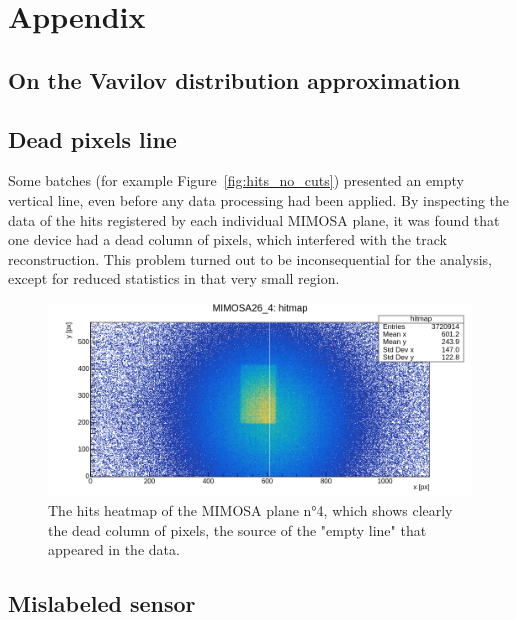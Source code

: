 \chapter{Appendix}\label{chap:appendix}


\section[Vavilov vs Landau distribution]{On the Vavilov distribution approximation}\label{sec:vavilov_vs_landau_distribution}

% 



\section{Dead pixels line}

Some batches (for example Figure~\ref{fig:hits_no_cuts}) presented an empty vertical line, even before any data processing had been applied. By inspecting the data of the hits registered by each individual MIMOSA plane, it was found that one device had a dead column of pixels, which interfered with the track reconstruction. This problem turned out to be inconsequential for the analysis, except for reduced statistics in that very small region.

\begin{figure}[h!tbp]
    \centering
    \includegraphics[width=.9\linewidth]{Images/appendix/hits_MIMOSA4.png}
    \caption{The hits heatmap of the MIMOSA plane n°4, which shows clearly the dead column of pixels, the source of the "empty line" that appeared in the data.}
    \label{fig:MIMOSA4_hits}
\end{figure}


\section{Mislabeled sensor}\label{sec:mislabeled_sensor}

